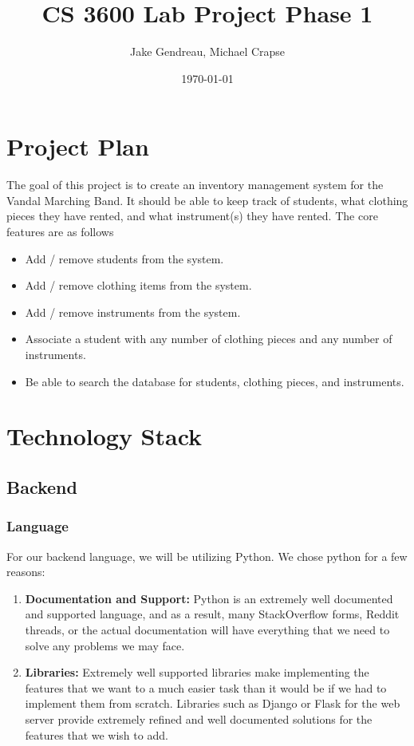 \documentclass[11pt]{article}
\title{CS 3600 Lab Project Phase 1}
\author{Jake Gendreau, Michael Crapse}
\date{\today}
\begin{document}
\maketitle	

\tableofcontents
\newpage

\section{Project Plan}
    The goal of this project is to create an inventory management system for the Vandal Marching Band. It should be able to keep track
    of students, what clothing pieces they have rented, and what instrument(s) they have rented. The core features are as follows
    \begin{itemize}
        \item Add / remove students from the system.
        \item Add / remove clothing items from the system.
        \item Add / remove instruments from the system.
        \item Associate a student with any number of clothing pieces and any number of instruments.
        \item Be able to search the database for students, clothing pieces, and instruments.
    \end{itemize}

\section{Technology Stack}
    \subsection{Backend}
        \subsubsection{Language} For our backend language, we will be utilizing Python. We chose python for a few reasons:
        \begin{enumerate}
            \item \textbf{Documentation and Support:} Python is an extremely well documented and supported language, and as a result, many StackOverflow
            forms, Reddit threads, or the actual documentation will have everything that we need to solve any problems we
            may face.
            \item \textbf{Libraries:} Extremely well supported libraries make implementing the features that we want to
            a much easier task than it would be if we had to implement them from scratch. Libraries such as Django
            or Flask for the web server provide extremely refined and well documented solutions for the features that we wish to add.
        \end{enumerate}
\end{document}
